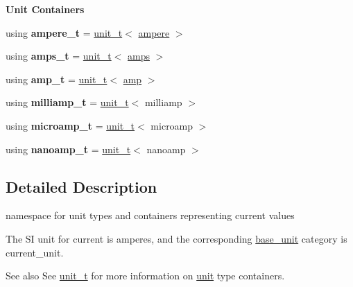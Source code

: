 \begin{Indent}{\bf Unit Containers}\par
{\em \label{namespaceunits_1_1current_currentContainers}%
\hypertarget{namespaceunits_1_1current_currentContainers}{}%
}\begin{DoxyCompactItemize}
\item 
\hypertarget{namespaceunits_1_1current_a5880e4155547ee2d8ee47ab646df53f6}{}using {\bfseries ampere\+\_\+t} = \hyperlink{classunits_1_1unit__t}{unit\+\_\+t}$<$ \hyperlink{structunits_1_1unit}{ampere} $>$\label{namespaceunits_1_1current_a5880e4155547ee2d8ee47ab646df53f6}

\item 
\hypertarget{namespaceunits_1_1current_a074e38162c14184b5e680ebe57a82a2f}{}using {\bfseries amps\+\_\+t} = \hyperlink{classunits_1_1unit__t}{unit\+\_\+t}$<$ \hyperlink{structunits_1_1unit}{amps} $>$\label{namespaceunits_1_1current_a074e38162c14184b5e680ebe57a82a2f}

\item 
\hypertarget{namespaceunits_1_1current_a561f9c18e5caefe134374158cdf67071}{}using {\bfseries amp\+\_\+t} = \hyperlink{classunits_1_1unit__t}{unit\+\_\+t}$<$ \hyperlink{structunits_1_1unit}{amp} $>$\label{namespaceunits_1_1current_a561f9c18e5caefe134374158cdf67071}

\item 
\hypertarget{namespaceunits_1_1current_a721c7a4ac8d6b1ca2e5832bcbf472e91}{}using {\bfseries milliamp\+\_\+t} = \hyperlink{classunits_1_1unit__t}{unit\+\_\+t}$<$ milliamp $>$\label{namespaceunits_1_1current_a721c7a4ac8d6b1ca2e5832bcbf472e91}

\item 
\hypertarget{namespaceunits_1_1current_acf14908bd575465c7bc337b2fe2b0ecc}{}using {\bfseries microamp\+\_\+t} = \hyperlink{classunits_1_1unit__t}{unit\+\_\+t}$<$ microamp $>$\label{namespaceunits_1_1current_acf14908bd575465c7bc337b2fe2b0ecc}

\item 
\hypertarget{namespaceunits_1_1current_a6b160c9e5cda8063b8ba5cc789ff9860}{}using {\bfseries nanoamp\+\_\+t} = \hyperlink{classunits_1_1unit__t}{unit\+\_\+t}$<$ nanoamp $>$\label{namespaceunits_1_1current_a6b160c9e5cda8063b8ba5cc789ff9860}

\end{DoxyCompactItemize}
\end{Indent}


\subsection{Detailed Description}
namespace for unit types and containers representing current values 

The S\+I unit for current is {\ttfamily amperes}, and the corresponding {\ttfamily \hyperlink{structunits_1_1base__unit}{base\+\_\+unit}} category is {\ttfamily current\+\_\+unit}. \begin{DoxySeeAlso}{See also}
See \hyperlink{classunits_1_1unit__t}{unit\+\_\+t} for more information on \hyperlink{structunits_1_1unit}{unit} type containers. 
\end{DoxySeeAlso}
